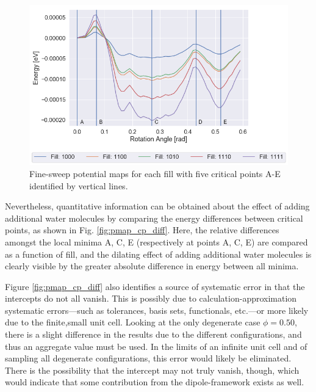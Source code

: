         
         \begin{figure}
             \centering
             \includegraphics[width=0.9\linewidth]{Figures/System/pmap_fine_sweep.png}
             \caption{Fine-sweep potential maps for each fill with five critical points A-E identified by vertical lines.}
             \label{fig:pmap_fine_sweep}
         \end{figure}
         
         Nevertheless, quantitative information can be obtained about the effect of adding additional water molecules by comparing the energy differences between critical points, as shown in Fig. \ref{fig:pmap_cp_diff}. Here, the relative differences amongst the local minima A, C, E (respectively at points A, C, E) are compared as a function of fill, and the dilating effect of adding additional water molecules is clearly visible by the greater absolute difference in energy between all minima. 
         
         Figure \ref{fig:pmap_cp_diff} also identifies a source of systematic error in that the intercepts do not all vanish. This is possibly due to calculation-approximation systematic errors---such as tolerances, basis sets, functionals, etc.---or more likely due to the finite,small unit cell. Looking at the only degenerate case $\phi=0.50$, there is a slight difference in the results due to the different configurations, and thus an aggregate value must be used. In the limits of an infinite unit cell and of sampling all degenerate configurations, this error would likely be eliminated. There is the possibility that the intercept may not truly vanish, though, which would indicate that some contribution from the dipole-framework exists as well.
         
